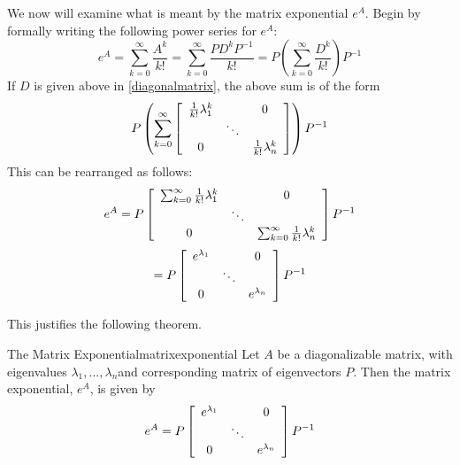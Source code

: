 We now will examine what is meant by the matrix exponential $e^{A}$. Begin by formally writing the following power series for $e^{A}$:
\begin{equation*}
e^{A} =  \sum_{k=0}^{\infty }\frac{A^{k}}{k!}=\sum_{k=0}^{\infty }\frac{PD^{k}P^{-1}}{k!}=P \left( \sum_{k=0}^{\infty }\frac{D^{k}}{k!} \right)P^{-1}
\end{equation*}
If $D$ is given above in \ref{diagonalmatrix}, the above sum is of the form 
\begin{equation*}
P \left( \sum_{k=0}^{\infty }\left[ 
\begin{array}{ccc}
\frac{1}{k!}\lambda _{1}^{k} &  & 0 \\ 
& \ddots &  \\ 
0 &  & \frac{1}{k!}\lambda _{n}^{k}
\end{array}
\right] \right) P^{-1}
\end{equation*}
This can be rearranged as follows:
\begin{equation*}
e^{A}=P\left[ 
\begin{array}{ccc}
\sum_{k=0}^{\infty }\frac{1}{k!}\lambda _{1}^{k} &  & 0 \\ 
& \ddots &  \\ 
0 &  & \sum_{k=0}^{\infty }\frac{1}{k!}\lambda _{n}^{k}
\end{array}
\right] P^{-1}
\end{equation*}
\begin{equation*}
=P\left[ 
\begin{array}{ccc}
e^{\lambda _{1}} &  & 0 \\ 
& \ddots &  \\ 
0 &  & e^{\lambda _{n}}
\end{array}
\right] P^{-1}
\end{equation*}

This justifies the following theorem. 

\begin{theorem}{The Matrix Exponential}{matrixexponential}
Let $A$ be a diagonalizable matrix, with eigenvalues $\lambda_1, ..., \lambda_n$and corresponding matrix of eigenvectors $P$. Then the matrix exponential, $e^{A}$, is given by
\begin{equation*}
e^{A} = 
P\left[ 
\begin{array}{ccc}
e^{\lambda _{1}} &  & 0 \\ 
& \ddots &  \\ 
0 &  & e^{\lambda _{n}}
\end{array}
\right] P^{-1}
\end{equation*}
\end{theorem}

